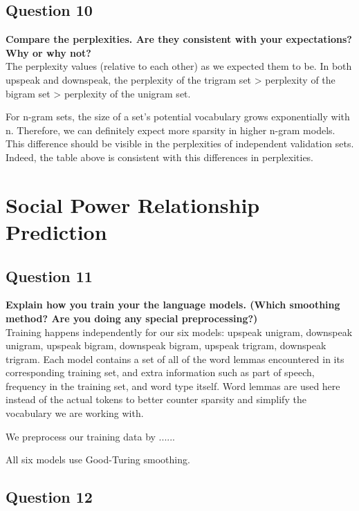 \documentclass{article} %
\begin{document}
\subsection*{Question 10}

\textbf{Compare the perplexities. Are they consistent with your expectations? Why or why not?}
\\

The perplexity values (relative to each other) as we expected them to be. In both upspeak and downspeak, the perplexity of the trigram set > perplexity of the bigram set > perplexity of the unigram set.

For n-gram sets, the size of a set's potential vocabulary grows exponentially with n. Therefore, we can definitely expect more sparsity in higher n-gram models. This difference should be visible in the perplexities of independent validation sets. Indeed, the table above is consistent with this differences in perplexities.


\section{Social Power Relationship Prediction}


\subsection*{Question 11}

\textbf{Explain how you train your the language models. (Which smoothing method? Are you doing any special preprocessing?)}
\\

Training happens independently for our six models: upspeak unigram, downspeak unigram, upspeak bigram, downspeak bigram, upspeak trigram, downspeak trigram. Each model contains a set of all of the word lemmas encountered in its corresponding training set, and extra information such as part of speech, frequency in the training set, and word type itself. Word lemmas are used here instead of the actual tokens to better counter sparsity and simplify the vocabulary we are working with.

We preprocess our training data by ......

All six models use Good-Turing smoothing.

\subsection*{Question 12}
\end{document}
